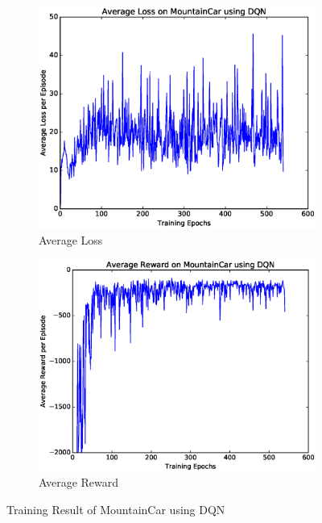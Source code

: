 \documentclass[a4paper,UTF8]{article}
\theoremstyle{definition}
\begin{document}
\begin{figure}[H]
	\centering
	\begin{subfigure}[t]{0.5\textwidth}
		\centering
		\includegraphics[scale=0.35]{figures/car-dqn-loss}
		\caption{Average Loss}
	\end{subfigure}%
	\begin{subfigure}[t]{0.5\textwidth}
		\centering
		\includegraphics[scale=0.35]{figures/car-dqn-reward}
		\caption{Average Reward}
	\end{subfigure}
	\caption{Training Result of MountainCar using DQN}\label{fig:car-dqn}
\end{figure}
\end{document}
